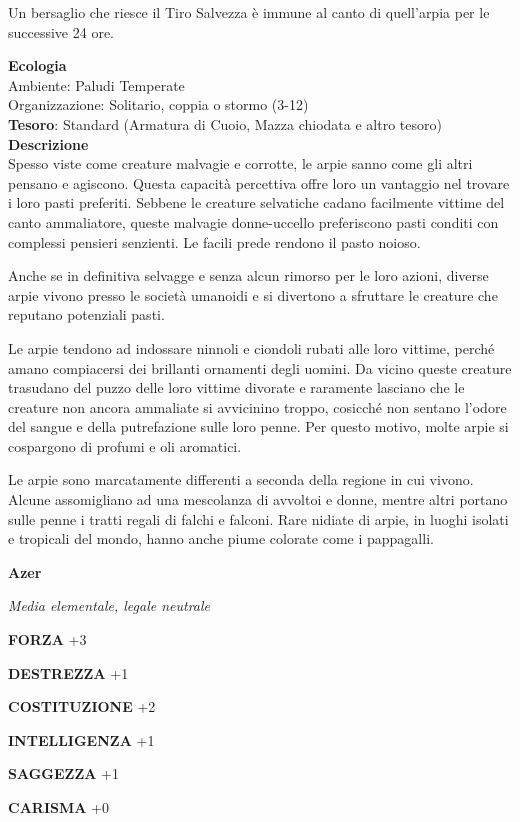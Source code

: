 \begin{multicols}{2}
	Un bersaglio che riesce il Tiro Salvezza è immune al canto di quell'arpia per le successive 24 ore.

	\textbf{Ecologia}\\
	Ambiente: Paludi Temperate\\
	Organizzazione: Solitario, coppia o stormo (3-12)\\
	\textbf{Tesoro}: Standard (Armatura di Cuoio, Mazza chiodata e altro tesoro)\\
	\textbf{Descrizione}\\
	Spesso viste come creature malvagie e corrotte, le arpie sanno come gli altri pensano e agiscono. Questa capacità percettiva offre loro un vantaggio nel trovare i loro pasti preferiti. Sebbene le creature selvatiche cadano facilmente vittime del canto ammaliatore, queste malvagie donne-uccello preferiscono pasti conditi con complessi pensieri senzienti. Le facili prede rendono il pasto noioso.

	Anche se in definitiva selvagge e senza alcun rimorso per le loro azioni, diverse arpie vivono presso le società umanoidi e si divertono a sfruttare le creature che reputano potenziali pasti.

	Le arpie tendono ad indossare ninnoli e ciondoli rubati alle loro vittime, perché amano compiacersi dei brillanti ornamenti degli uomini. Da vicino queste creature trasudano del puzzo delle loro vittime divorate e raramente lasciano che le creature non ancora ammaliate si avvicinino troppo, cosicché non sentano l'odore del sangue e della putrefazione sulle loro penne. Per questo motivo, molte arpie si cospargono di profumi e oli aromatici.

	Le arpie sono marcatamente differenti a seconda della regione in cui vivono. Alcune assomigliano ad una mescolanza di avvoltoi e donne, mentre altri portano sulle penne i tratti regali di falchi e falconi. Rare nidiate di arpie, in luoghi isolati e tropicali del mondo, hanno anche piume colorate come i pappagalli.

	\medskip{}\textbf{Azer}

	\textit{Media elementale, legale neutrale}

	\textbf{FORZA} +3

	\textbf{DESTREZZA} +1

	\textbf{COSTITUZIONE} +2

	\textbf{INTELLIGENZA} +1

	\textbf{SAGGEZZA} +1

	\textbf{CARISMA} +0


\end{multicols}
